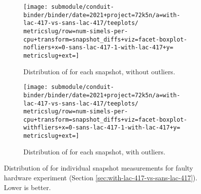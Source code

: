 \begin{figure*}[h]
  \centering
  \begin{subfigure}[b]{0.5\textwidth}
    \centering
    \texttt{[image: submodule/conduit-binder/binder/date=2021+project=72k5n/a=with-lac-417-vs-sans-lac-417/teeplots/\\metricslug/row=num-simels-per-cpu+transform=snapshot\_diffs+viz=facet-boxplot-nofliers+x=0-sans-lac-417-1-with-lac-417+y=\\metricslug+ext=]}
    \caption{Distribution of \metric{} for each snapshot, without outliers.}
    \label{fig:with-lac-417-vs-sans-lac-417-distribution-\metricslug-nofliers}
  \end{subfigure}%
  \begin{subfigure}[b]{0.5\textwidth}
    \centering
    \texttt{[image: submodule/conduit-binder/binder/date=2021+project=72k5n/a=with-lac-417-vs-sans-lac-417/teeplots/\\metricslug/row=num-simels-per-cpu+transform=snapshot\_diffs+viz=facet-boxplot-withfliers+x=0-sans-lac-417-1-with-lac-417+y=\\metricslug+ext=]}
    \caption{Distribution of \metric{} for each snapshot, with outliers.}
    \label{fig:with-lac-417-vs-sans-lac-417-distribution-\metricslug-withfliers}
  \end{subfigure}
  \caption{Distribution of \metric{} for individual snapshot measurements for faulty hardware experiment (Section \ref{sec:with-lac-417-vs-sans-lac-417}). Lower is better.}
  \label{fig:with-lac-417-vs-sans-lac-417-distribution-\metricslug}
\end{figure*}
